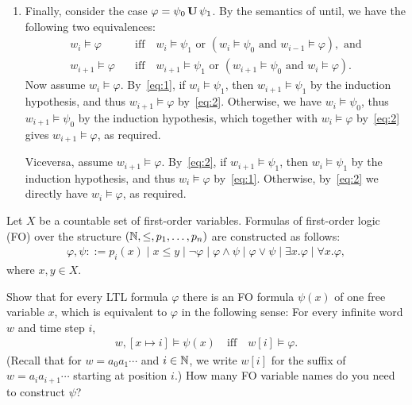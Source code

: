 \begin{solution}
\begin{enumerate}
		\item Finally, consider the case $\varphi = \psi_0 \,\mathbf U\, \psi_1$.
		By the semantics of until, we have the following two equivalences:
		\begin{align}
			\label{eq:1}
			w_i \models \varphi
				&\quad\text{iff}\quad
					w_i \models \psi_1 \text{ or } (w_i \models \psi_0 \text{ and } w_{i-1} \models \varphi), \text{ and} \\
			\label{eq:2}
			w_{i+1} \models \varphi
				&\quad\text{iff}\quad
					w_{i+1} \models \psi_1 \text{ or } (w_{i+1} \models \psi_0 \text{ and } w_i \models \varphi).
		\end{align}
		Now assume $w_i \models \varphi$.
		By~\cref{eq:1}, if $w_i \models \psi_1$, then $w_{i+1} \models \psi_1$ by the induction hypothesis,
		and thus $w_{i+1} \models \varphi$ by~\cref{eq:2}.
		Otherwise, we have $w_i \models \psi_0$, thus $w_{i+1} \models \psi_0$ by the induction hypothesis,
		which together with $w_i \models \varphi$ by~\cref{eq:2} gives $w_{i+1} \models \varphi$, as required.

		Viceversa, assume $w_{i+1} \models \varphi$.
		By~\cref{eq:2}, if $w_{i+1} \models \psi_1$, then $w_i \models \psi_1$ by the induction hypothesis,
		and thus $w_i \models \varphi$ by~\cref{eq:1}.
		Otherwise, by~\cref{eq:2} we directly have $w_i \models \varphi$, as required.
		\qedhere
	\end{enumerate}
\end{solution}

Let $X$ be a countable set of first-order variables.
Formulas of first-order logic (FO) over the structure $\left( \mathbb N, \leq, p_1, \dots, p_n \right)$
are constructed as follows:
%
\begin{align*}
	\varphi, \psi ::=
		p_i(x) \mid x \leq y \mid
		\neg \varphi \mid \varphi \land \psi \mid \varphi \lor \psi \mid
		\exists x. \varphi \mid \forall x. \varphi,
\end{align*}
%
where $x, y \in X$.

\begin{exercise}
	Show that for every LTL formula $\varphi$
	there is an FO formula $\psi(x)$ of one free variable $x$,
	which is equivalent to $\varphi$ in the following sense:
	For every infinite word $w$ and time step $i$,
	\begin{align}
		\label{eq:equivalence}
		w, [x \mapsto i] \models \psi(x)
			\quad\text{iff}\quad
				w[i] \models \varphi.
	\end{align}
	(Recall that for $w = a_0 a_1 \cdots$ and $i \in \mathbb N$,
	we write $w[i]$ for the suffix of $w = a_i a_{i+1} \cdots$ starting at position $i$.)
	How many FO variable names do you need to construct $\psi$?
\end{exercise}

